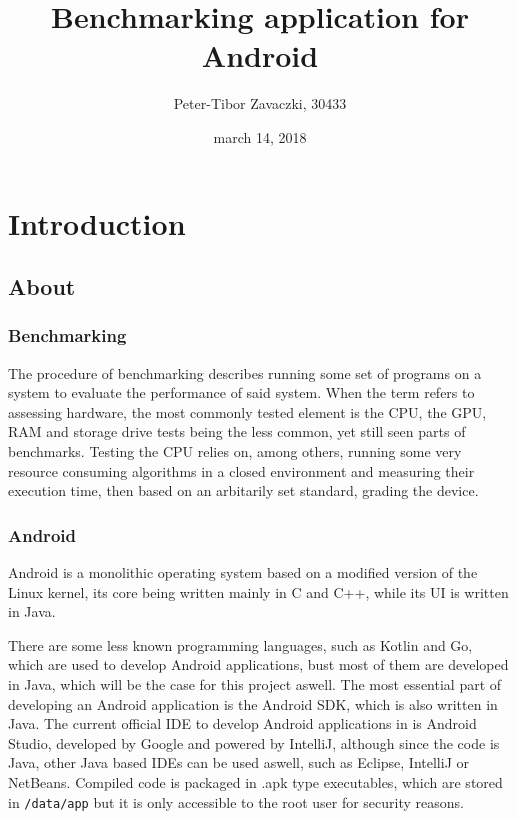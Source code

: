 \documentclass[a4paper,10pt]{report}
\title{
Benchmarking application for Android
}
\author{Peter-Tibor Zavaczki, 30433}
\date{march 14, 2018}
\newcommand{\code}{\texttt}
\begin{document}
\maketitle

\chapter{Introduction}
\section{About}
 \subsection{Benchmarking}
 The procedure of benchmarking describes running some set of programs on a system to evaluate the performance of said system. When the term refers to assessing hardware, the most commonly tested element is the CPU, the GPU, RAM and storage drive tests being the less common, yet still seen parts of benchmarks. Testing the CPU relies on, among others, running some very resource consuming algorithms in a closed environment and measuring their execution time, then based on an arbitarily set standard, grading the device.
 \subsection{Android}
 Android is a monolithic operating system based on a modified version of the Linux kernel, its core being written mainly in C and C++, while its UI is written in Java.

 There are some less known programming languages, such as Kotlin and Go, which are used to develop Android applications, bust most of them are developed in Java, which will be the case for this project aswell. The most essential part of developing an Android application is the Android SDK, which is also written in Java. The current official IDE to develop Android applications in is Android Studio, developed by Google and powered by IntelliJ, although since the code is Java, other Java based IDEs can be used aswell, such as Eclipse, IntelliJ or NetBeans. Compiled code is packaged in .apk type executables, which are stored in \code{/data/app} but it is only accessible to the root user for security reasons.

\newpage
\end{document}
